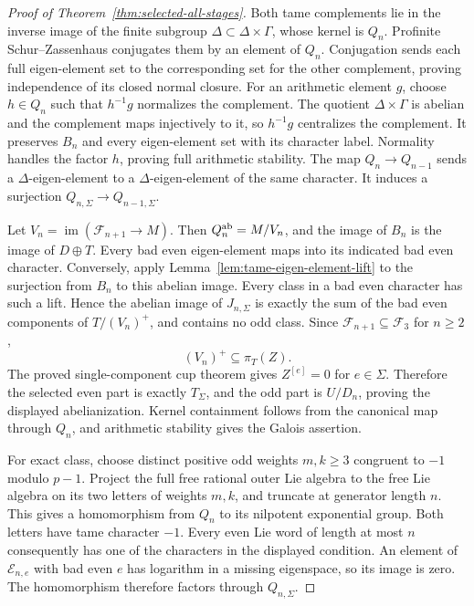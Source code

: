 \documentclass[11pt]{article}
\theoremstyle{definition}\newtheorem{definition}[theorem]{Definition}
\begin{document}
\begin{proof}[Proof of Theorem~\ref{thm:selected-all-stages}]
Both tame complements lie in the inverse image of the finite subgroup \(\Delta\subset\Delta\times\Gamma\), whose kernel is \(Q_n\). Profinite Schur--Zassenhaus conjugates them by an element of \(Q_n\). Conjugation sends each full eigen-element set to the corresponding set for the other complement, proving independence of its closed normal closure. For an arithmetic element \(g\), choose \(h\in Q_n\) such that \(h^{-1}g\) normalizes the complement. The quotient \(\Delta\times\Gamma\) is abelian and the complement maps injectively to it, so \(h^{-1}g\) centralizes the complement. It preserves \(B_n\) and every eigen-element set with its character label. Normality handles the factor \(h\), proving full arithmetic stability. The map \(Q_n\to Q_{n-1}\) sends a
\(\Delta\)-eigen-element to a \(\Delta\)-eigen-element of
the same character. It induces a surjection
\(Q_{n,\Sigma}\to Q_{n-1,\Sigma}\).

Let \(V_n=\operatorname{im}(\mathcal F_{n+1}\to M)\). Then
\(Q_n^{\rm ab}=M/V_n\), and the image of \(B_n\) is the
image of \(D\oplus T\). Every bad even eigen-element maps
into its indicated bad even character. Conversely, apply
Lemma~\ref{lem:tame-eigen-element-lift} to the surjection
from \(B_n\) to this abelian image. Every class in a bad
even character has such a lift. Hence the abelian image of
\(J_{n,\Sigma}\) is exactly the sum of the bad even
components of \(T/(V_n)^+\), and contains no odd class.
Since \(\mathcal F_{n+1}\subseteq \mathcal F_3\) for \(n\geq2\),
\[
                   (V_n)^+\subseteq\pi_T(Z).
\]
The proved single-component cup theorem gives
\(Z^{[e]}=0\) for \(e\in\Sigma\). Therefore the selected
even part is exactly \(T_\Sigma\), and the odd part is
\(U/D_n\), proving the displayed abelianization.
Kernel containment follows from the canonical map through
\(Q_n\), and arithmetic stability gives the Galois assertion.

For exact class, choose distinct positive odd weights
\(m,k\geq3\) congruent to \(-1\) modulo \(p-1\).
Project the full free rational outer Lie algebra to the
free Lie algebra on its two letters of weights \(m,k\),
and truncate at generator length \(n\). This gives a
homomorphism from \(Q_n\) to its nilpotent exponential group.
Both letters have tame character \(-1\). Every even Lie
word of length at most \(n\) consequently has one of the
characters in the displayed condition. An element of
\(\mathcal E_{n,e}\) with bad even \(e\) has logarithm in
a missing eigenspace, so its image is zero. The homomorphism
therefore factors through \(Q_{n,\Sigma}\).


\end{proof}
\end{document}

